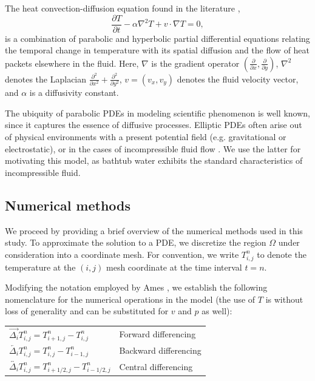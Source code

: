 \documentclass[12pt]{amsart}
\newcommand{\la}{\overleftarrow}
\newcommand{\ra}{\overrightarrow}
\newcommand{\ca}{\overleftrightarrow}
\begin{document}
The heat convection-diffusion equation found in the literature
\cite{convection-diffusion},
\begin{equation}
    \frac{\partial T}{\partial t} - \alpha \nabla^2 T + v \cdot \nabla T =
    0,
    \label{eq:\theequation}
\end{equation}
is a combination of parabolic and hyperbolic partial differential equations
relating the temporal change in temperature with its spatial diffusion and
the flow of heat packets elsewhere in the fluid.     Here, $\nabla$ is the
gradient operator $\left( \frac{\partial}{\partial x},
\frac{\partial}{\partial y} \right)$, $\nabla^2$ denotes the Laplacian
$\frac{\partial^2}{\partial x^2} + \frac{\partial^2}{\partial y^2}$, $v =
(v_x, v_y)$ denotes the fluid velocity vector, and $\alpha$ is a diffusivity
constant.

The ubiquity of parabolic PDEs in modeling scientific phenomenon is well
known, since it captures the essence of diffusive processes. Elliptic PDEs
often arise out of physical environments with a present potential field
(e.g.  gravitational or electrostatic), or in the cases of incompressible
fluid flow \cite{convection-diffusion, ames}. We use the latter for
motivating this model, as bathtub water exhibits the standard
characteristics of incompressible fluid.

\subsection{Numerical methods}

We proceed by providing a brief overview of the numerical methods used in
this study. To approximate the solution to a PDE, we discretize the region
$\Omega$ under consideration into a coordinate mesh. For convention, we
write $T_{i,j}^{n}$ to denote the temperature at the $(i,j)$ mesh coordinate
at the time interval $t=n$. 

Modifying the notation employed by Ames \cite{ames}, we establish the
following nomenclature for the numerical operations in the model (the use of $T$
is without loss of generality and can be substituted for $v$ and $p$ as well):

\begin{center}
    \begin{tabular}[]{ll}
        $\ra{\Delta_i} T_{i,j}^n = T_{i+1,j}^n - T_{i,j}^n$ & Forward
        differencing \\
        $\la{\Delta_i} T_{i,j}^n = T_{i,j}^n - T_{i-1,j}^n$ & Backward differencing \\
        $\ca{\Delta_i} T_{i,j}^n = T_{i+1/2,j}^n - T_{i-1/2,j}^n$ & Central differencing
    \end{tabular}
\end{center}
\end{document}

